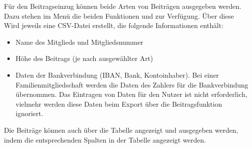 \begin{neu}
Für den Beitragseinzug können beide Arten von Beiträgen ausgegeben werden.
Dazu stehen im Menü  die beiden Funktionen  und  zur Verfügung.
Über diese Wird jeweils eine CSV-Datei erstellt, die folgende Informationen enthält:
\begin{itemize}
  \item
  Name des Mitglieds und Mitgliedsnummer
  \item
  Höhe des Beitrags (je nach ausgewählter Art)
  \item
  Daten der Bankverbindung (IBAN, Bank, Kontoinhaber).
  Bei einer Familienmitgliedschaft werden die Daten des Zahlers für die Bankverbindung übernommen.
  Das Eintragen von Daten für den Nutzer ist nicht erforderlich,
  vielmehr werden diese Daten beim Export über die Beitragsfunktion ignoriert.
\end{itemize}

Die Beiträge können auch über die Tabelle angezeigt und ausgegeben werden,
indem die entsprechenden Spalten in der Tabelle angezeigt werden.
\end{neu}
